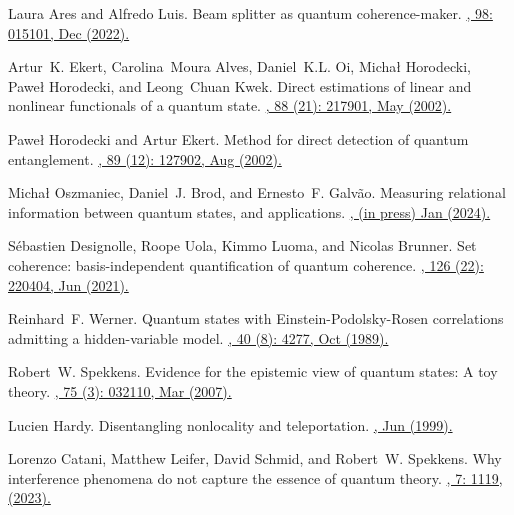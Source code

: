 \documentclass[a4paper,twocolumn,11pt,accepted=2024-01-17]{quantumarticle}
\begin{document}
\begin{thebibliography}{100}
Laura Ares and Alfredo Luis.
\newblock Beam splitter as quantum coherence-maker.
\href{http://dx.doi.org/10.1088/1402-4896/aca1e7}{, 98: 015101, Dec (2022).}

Artur~K. Ekert, Carolina~Moura Alves, Daniel~K.L. Oi, Micha{\l} Horodecki,
  Pawe{\l} Horodecki, and Leong~Chuan Kwek.
\newblock Direct estimations of linear and nonlinear functionals of a quantum
  state.
\href{https://doi.org/10.1103/PhysRevLett.88.217901}{, 88 (21): 217901, May (2002).}

Pawe{\l} Horodecki and Artur Ekert.
\newblock Method for direct detection of quantum entanglement.
\href{https://doi.org/10.1103/PhysRevLett.89.127902}{, 89 (12): 127902, Aug (2002).}

Micha{\l} Oszmaniec, Daniel~J. Brod, and Ernesto~F. Galv{\~a}o.
\newblock Measuring relational information between quantum states, and
  applications.
\href{http://dx.doi.org/10.1088/1367-2630/ad1a27}{, (in press) Jan (2024).}

S{\'e}bastien Designolle, Roope Uola, Kimmo Luoma, and Nicolas Brunner.
\newblock Set coherence: basis-independent quantification of quantum coherence.
\href{https://doi.org/10.1103/PhysRevLett.126.220404}{, 126 (22): 220404, Jun (2021).}

Reinhard~F. Werner.
\newblock Quantum states with {E}instein-{P}odolsky-{R}osen correlations
  admitting a hidden-variable model.
\href{https://doi.org/10.1103/PhysRevA.40.4277}{, 40 (8): 4277, Oct (1989).}

Robert~W. Spekkens.
\newblock Evidence for the epistemic view of quantum states: A toy theory.
\href{https://doi.org/10.1103/PhysRevA.75.032110}{, 75 (3): 032110, Mar (2007).}

Lucien Hardy.
\newblock Disentangling nonlocality and teleportation.
\href{https://doi.org/10.48550/arXiv.quant-ph/9906123}{, Jun (1999).}

Lorenzo Catani, Matthew Leifer, David Schmid, and Robert~W. Spekkens.
\newblock Why interference phenomena do not capture the essence of quantum
  theory.
\href{https://doi.org/10.22331/q-2023-09-25-1119}{, 7: 1119, (2023).}


\end{thebibliography}
\end{document}
